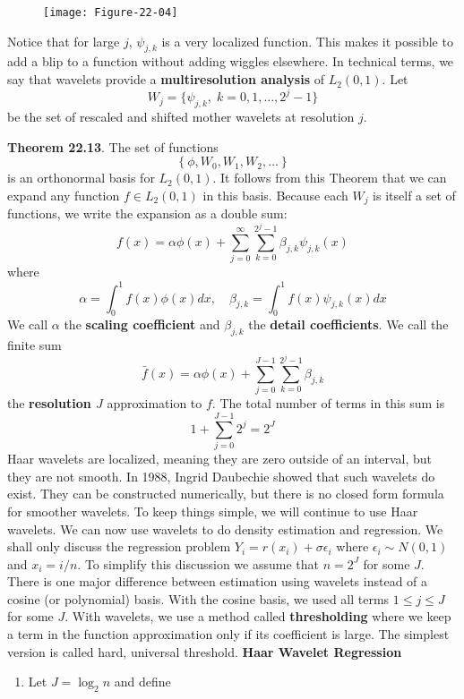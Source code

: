 \begin{figure}[H]
\centering
\texttt{[image: Figure-22-04]}
\end{figure}

Notice that for large \(j\), \(\psi_{j, k}\) is a very localized
function. This makes it possible to add a blip to a function without
adding wiggles elsewhere. In technical terms, we say that wavelets
provide a \textbf{multiresolution analysis} of \(L_{2}(0, 1)\).
Let
\[
W_{j} = \{\psi_{j, k}, \; k = 0, 1, \dots, 2^{j} - 1\}
\]
be the set of rescaled and shifted mother wavelets at resolution \(j\).

\textbf{Theorem 22.13}. The set of functions
\[
\left\{ \phi, W_{0}, W_{1}, W_{2}, \dots \right\}
\]
is an orthonormal basis for \(L_{2}(0, 1)\).
It follows from this Theorem that we can expand any function
\(f \in L_{2}(0, 1)\) in this basis. Because each \(W_{j}\) is itself a set
of functions, we write the expansion as a double sum:
\[
f(x) = \alpha \phi(x) + \sum_{j=0}^{\infty} \sum_{k=0}^{2^{j} - 1} \beta_{j, k} \psi_{j, k}(x)
\]
where
\[
\alpha = \int_{0}^{1} f(x) \phi(x) dx, \quad \beta_{j, k} = \int_{0}^{1} f(x) \psi_{j, k}(x) dx
\]
We call \(\alpha\) the \textbf{scaling coefficient} and \(\beta_{j, k}\)
the \textbf{detail coefficients}. We call the finite sum
\[
\bar{f}(x) = \alpha \phi(x) + \sum_{j=0}^{J - 1} \sum_{k=0}^{2^{j} - 1} \beta_{j, k}
\]
the \textbf{resolution \(J\)} approximation to \(f\). The total number
of terms in this sum is
\[
1 + \sum_{j=0}^{J - 1}2^{j} = 2^J
\]
Haar wavelets are localized, meaning they are zero outside of an
interval, but they are not smooth. In 1988, Ingrid Daubechie showed that
such wavelets do exist. They can be constructed numerically, but there
is no closed form formula for smoother wavelets. To keep things simple,
we will continue to use Haar wavelets.
We can now use wavelets to do density estimation and regression. We
shall only discuss the regression problem
\(Y_{i} = r(x_{i}) + \sigma \epsilon_{i}\) where \(\epsilon_{i} \sim N(0, 1)\)
and \(x_{i} = i / n\). To simplify this discussion we assume that
\(n = 2^J\) for some \(J\).
There is one major difference between estimation using wavelets instead
of a cosine (or polynomial) basis. With the cosine basis, we used all
terms \(1 \leq j \leq J\) for some \(J\). With wavelets, we use a method
called \textbf{thresholding} where we keep a term in the function
approximation only if its coefficient is large. The simplest version is
called hard, universal threshold.
\textbf{Haar Wavelet Regression}
\begin{enumerate}[tightlist,label={\arabic*.}]
\item
  Let \(J = \log_{2} n\) and define
\end{enumerate}
